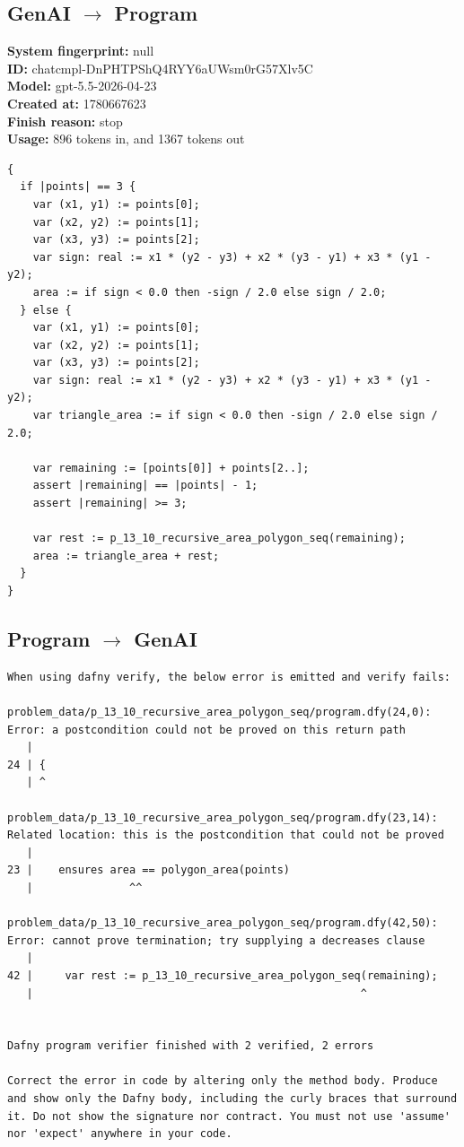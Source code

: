 \documentclass{article}
\begin{document}
\subsection*{GenAI $\rightarrow$ Program}
\textbf{System fingerprint: }null
\\\textbf{ID: }chatcmpl-DnPHTPShQ4RYY6aUWsm0rG57Xlv5C
\\\textbf{Model: }gpt-5.5-2026-04-23
\\\textbf{Created at: }1780667623
\\\textbf{Finish reason: }stop
\\\textbf{Usage: }896 tokens in, and 1367 tokens out
\begin{lstlisting}
{
  if |points| == 3 {
    var (x1, y1) := points[0];
    var (x2, y2) := points[1];
    var (x3, y3) := points[2];
    var sign: real := x1 * (y2 - y3) + x2 * (y3 - y1) + x3 * (y1 - y2);
    area := if sign < 0.0 then -sign / 2.0 else sign / 2.0;
  } else {
    var (x1, y1) := points[0];
    var (x2, y2) := points[1];
    var (x3, y3) := points[2];
    var sign: real := x1 * (y2 - y3) + x2 * (y3 - y1) + x3 * (y1 - y2);
    var triangle_area := if sign < 0.0 then -sign / 2.0 else sign / 2.0;

    var remaining := [points[0]] + points[2..];
    assert |remaining| == |points| - 1;
    assert |remaining| >= 3;

    var rest := p_13_10_recursive_area_polygon_seq(remaining);
    area := triangle_area + rest;
  }
}
\end{lstlisting}
\subsection*{Program $\rightarrow$ GenAI}
\begin{lstlisting}
When using dafny verify, the below error is emitted and verify fails:

problem_data/p_13_10_recursive_area_polygon_seq/program.dfy(24,0): Error: a postcondition could not be proved on this return path
   |
24 | {
   | ^

problem_data/p_13_10_recursive_area_polygon_seq/program.dfy(23,14): Related location: this is the postcondition that could not be proved
   |
23 | 	ensures area == polygon_area(points)
   |               ^^

problem_data/p_13_10_recursive_area_polygon_seq/program.dfy(42,50): Error: cannot prove termination; try supplying a decreases clause
   |
42 |     var rest := p_13_10_recursive_area_polygon_seq(remaining);
   |                                                   ^


Dafny program verifier finished with 2 verified, 2 errors

Correct the error in code by altering only the method body. Produce and show only the Dafny body, including the curly braces that surround it. Do not show the signature nor contract. You must not use 'assume' nor 'expect' anywhere in your code.
\end{lstlisting}
\end{document}
